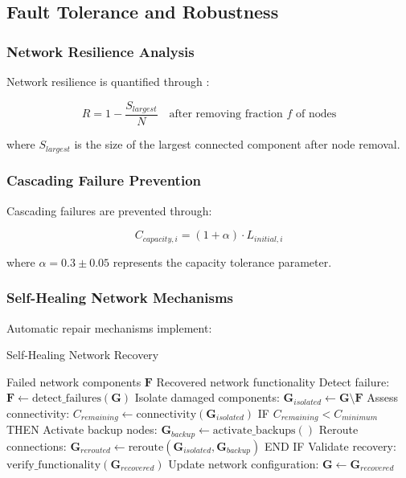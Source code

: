 \subsection{Fault Tolerance and Robustness}

\subsubsection{Network Resilience Analysis}

Network resilience is quantified through \cite{albert2000error}:

\begin{equation}
R = 1 - \frac{S_{largest}}{N} \quad \text{after removing fraction } f \text{ of nodes}
\end{equation}

where $S_{largest}$ is the size of the largest connected component after node removal.

\subsubsection{Cascading Failure Prevention}

Cascading failures are prevented through:

\begin{equation}
C_{capacity,i} = (1 + \alpha) \cdot L_{initial,i}
\end{equation}

where $\alpha = 0.3 \pm 0.05$ represents the capacity tolerance parameter.

\subsubsection{Self-Healing Network Mechanisms}

Automatic repair mechanisms implement:

\begin{algorithm}[H]
\caption{Self-Healing Network Recovery}
\begin{algorithmic}[1]
\REQUIRE Failed network components $\mathbf{F}$
\ENSURE Recovered network functionality
\STATE Detect failure: $\mathbf{F} \leftarrow \text{detect\_failures}(\mathbf{G})$
\STATE Isolate damaged components: $\mathbf{G}_{isolated} \leftarrow \mathbf{G} \setminus \mathbf{F}$
\STATE Assess connectivity: $C_{remaining} \leftarrow \text{connectivity}(\mathbf{G}_{isolated})$
\STATE IF $C_{remaining} < C_{minimum}$ THEN
\STATE \quad Activate backup nodes: $\mathbf{G}_{backup} \leftarrow \text{activate\_backups}()$
\STATE \quad Reroute connections: $\mathbf{G}_{rerouted} \leftarrow \text{reroute}(\mathbf{G}_{isolated}, \mathbf{G}_{backup})$
\STATE END IF
\STATE Validate recovery: $\text{verify\_functionality}(\mathbf{G}_{recovered})$
\STATE Update network configuration: $\mathbf{G} \leftarrow \mathbf{G}_{recovered}$
\end{algorithmic}
\end{algorithm}


